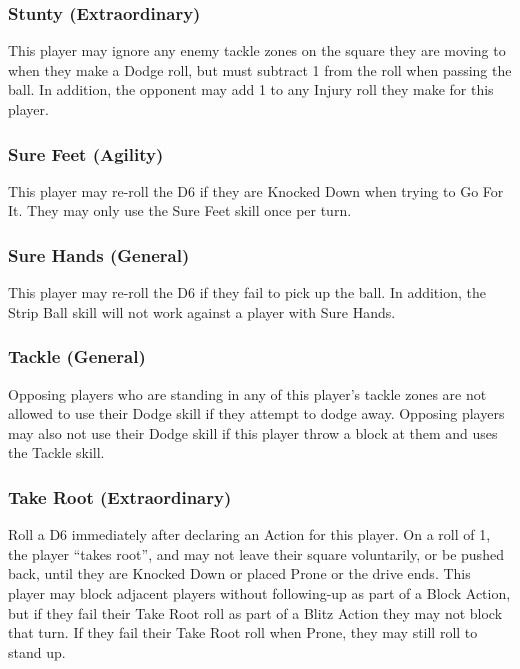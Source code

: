 \begin{multicols}{3}
\subsubsection{Stunty (Extraordinary)}
\par This player may ignore any enemy tackle zones on the square they are moving to when they make a Dodge roll, but must subtract 1 from the roll when passing the ball. In addition, the opponent may add 1 to any Injury roll they make for this player.

\subsubsection{Sure Feet (Agility)}
\par This player may re-roll the D6 if they are Knocked Down when trying to Go For It. They may only use the Sure Feet skill once per turn.

\subsubsection{Sure Hands (General)}
\par This player may re-roll the D6 if they fail to pick up the ball. In addition, the Strip Ball skill will not work against a player with Sure Hands.

\subsubsection{Tackle (General)}
\par Opposing players who are standing in any of this player's tackle zones are not allowed to use their Dodge skill if they attempt to dodge away. Opposing players may also not use their Dodge skill if this player throw a block at them and uses the Tackle skill.

\subsubsection{Take Root (Extraordinary)}
\par Roll a D6 immediately after declaring an Action for this player. On a roll of 1, the player “takes root”, and may not leave their square voluntarily, or be pushed back, until they are Knocked Down or placed Prone or the drive ends. This player may block adjacent players without following-up as part of a Block Action, but if they fail their Take Root roll as part of a Blitz Action they may not block that turn.  If they fail their Take Root roll when Prone, they may still roll to stand up.


\end{multicols}
